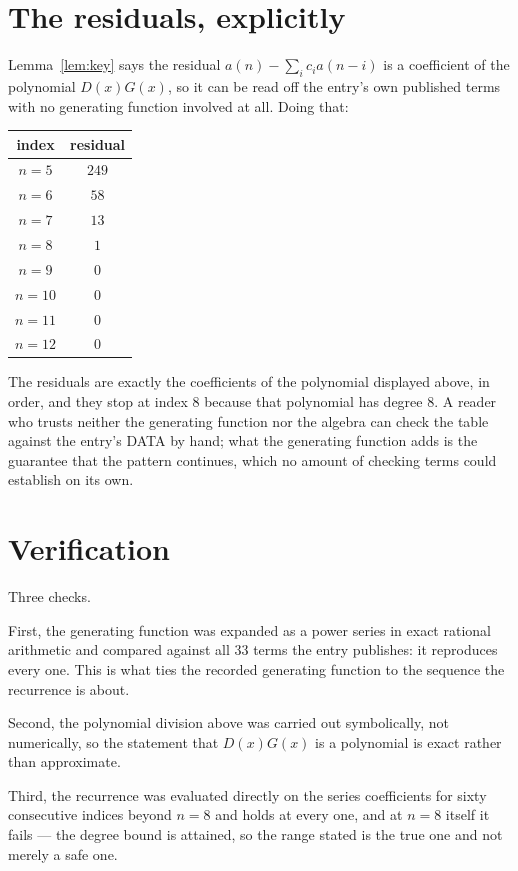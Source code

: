 \documentclass[11pt,a4paper]{article}
\theoremstyle{plain}
\theoremstyle{definition}
\begin{document}
\section{The residuals, explicitly}

Lemma~\ref{lem:key} says the residual $a(n)-\sum_ic_ia(n-i)$ is a coefficient of the
polynomial $D(x)G(x)$, so it can be read off the entry's own published terms with no
generating function involved at all. Doing that:
\begin{center}
\begin{tabular}{cc}
index & residual \\ \hline
$n=5$ & $249$ \\
$n=6$ & $58$ \\
$n=7$ & $13$ \\
$n=8$ & $1$ \\
$n=9$ & $0$ \\
$n=10$ & $0$ \\
$n=11$ & $0$ \\
$n=12$ & $0$
\end{tabular}
\end{center}
The residuals are exactly the coefficients of the polynomial displayed above, in order, and
they stop at index $8$ because that polynomial has degree $8$. A reader who trusts
neither the generating function nor the algebra can check the table against the entry's DATA
by hand; what the generating function adds is the guarantee that the pattern continues, which
no amount of checking terms could establish on its own.

\section{Verification}

Three checks.

First, the generating function was expanded as a power series in exact rational arithmetic and
compared against all $33$ terms the entry publishes: it reproduces every one. This is
what ties the recorded generating function to the sequence the recurrence is about.

Second, the polynomial division above was carried out symbolically, not numerically, so the
statement that $D(x)G(x)$ is a polynomial is exact rather than approximate.

Third, the recurrence was evaluated directly on the series coefficients for sixty consecutive
indices beyond $n=8$ and holds at every one, and at $n=8$ itself it fails --- the
degree bound is attained, so the range stated is the true one and not merely a safe one.
\end{document}
